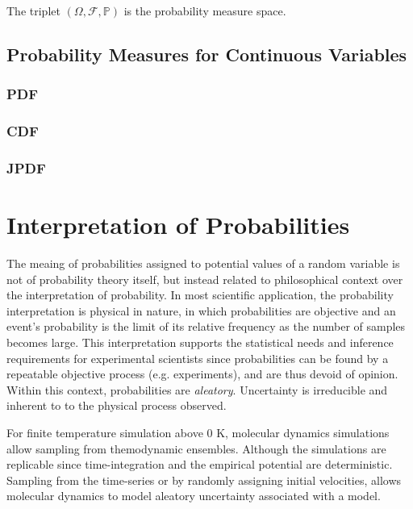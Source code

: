 The triplet $(\Omega,\mathcal{F},\mathbb{P})$ is the probability measure space.

\subsection{Probability Measures for Continuous Variables}

\subsubsection{PDF}

\subsubsection{CDF}

\subsubsection{JPDF}

\section{Interpretation of Probabilities}

The meaing of probabilities assigned to potential values of a random variable is not of probability theory itself, but instead related to philosophical context over the interpretation of probability.  In most scientific application, the probability interpretation is physical in nature, in which probabilities are objective and an event's probability is the limit of its relative frequency as the number of samples becomes large.  This interpretation supports the statistical needs and inference requirements for experimental scientists since probabilities can be found by a repeatable objective process (e.g. experiments), and are thus devoid of opinion.  Within this context, probabilities are \emph{aleatory}.  Uncertainty is irreducible and inherent to to the physical process observed.

For finite temperature simulation above $0$ K, molecular dynamics simulations allow sampling from themodynamic ensembles.  Although the simulations are replicable since time-integration and the empirical potential are deterministic.  Sampling from the time-series or by randomly assigning initial velocities, allows molecular dynamics to model aleatory uncertainty associated with a model.

